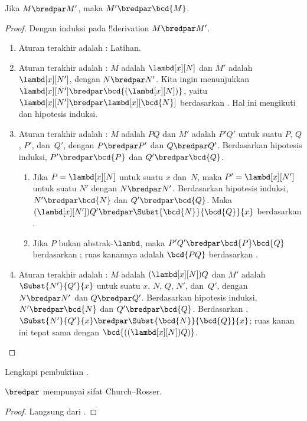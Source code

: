 \documentclass[../../../include/open-logic-section]{subfiles}
\begin{document}
\begin{lem}
  Jika $M \bredpar M'$, maka $M' \bredpar \bcd{M}$.
\end{lem}
\begin{proof}
  Dengan induksi pada !!{derivation} $M \bredpar M'$.
  \begin{enumerate}
    \item Aturan terakhir adalah : Latihan.
    \item Aturan terakhir adalah : $M$ adalah
      $\lambd[x][N]$ dan $M'$ adalah $\lambd[x][N']$, dengan
      $N\bredpar N'$. Kita ingin menunjukkan
      $\lambd[x][N']\bredpar\bcd{(\lambd[x][N])}$, yaitu
      $\lambd[x][N']\bredpar\lambd[x][\bcd{N}]$ berdasarkan
      . Hal ini mengikuti  dan
      hipotesis induksi.
    \item Aturan terakhir adalah : $M$ adalah $PQ$ dan
      $M'$ adalah $P'Q'$ untuk suatu $P$, $Q$, $P'$, dan~$Q'$, dengan
      $P\bredpar P'$ dan $Q\bredpar Q'$. Berdasarkan hipotesis induksi,
      $P'\bredpar\bcd{P}$ dan $Q'\bredpar\bcd{Q}$.
      \begin{enumerate}
        \item Jika $P=\lambd[x][N]$ untuk suatu $x$ dan~$N$, maka
          $P'=\lambd[x][N']$ untuk suatu $N'$ dengan $N\bredpar N'$.
          Berdasarkan hipotesis induksi, $N'\bredpar\bcd{N}$ dan
          $Q'\bredpar\bcd{Q}$. Maka
          $(\lambd[x][N'])Q'\bredpar\Subst{\bcd{N}}{\bcd{Q}}{x}$ berdasarkan
          .
        \item Jika $P$ bukan abstrak-$\lambd$, maka
          $P'Q'\bredpar\bcd{P}\bcd{Q}$ berdasarkan
          ; ruas kanannya adalah $\bcd{PQ}$ berdasarkan
          .
      \end{enumerate}
    \item Aturan terakhir adalah : $M$ adalah
      $(\lambd[x][N])Q$ dan $M'$ adalah $\Subst{N'}{Q'}{x}$ untuk suatu
      $x$, $N$, $Q$, $N'$, dan~$Q'$, dengan $N\bredpar N'$ dan
      $Q\bredpar Q'$. Berdasarkan hipotesis induksi,
      $N'\bredpar\bcd{N}$ dan $Q'\bredpar\bcd{Q}$. Berdasarkan
      ,
      $\Subst{N'}{Q'}{x}\bredpar\Subst{\bcd{N}}{\bcd{Q}}{x}$; ruas kanan
      ini tepat sama dengan $\bcd{((\lambd[x][N])Q)}$.
  \end{enumerate}
\end{proof}

\begin{prob}
  Lengkapi pembuktian .
\end{prob}

\begin{thm}
  $\bredpar$ mempunyai sifat Church--Rosser.
\end{thm}

\begin{proof}
  Langsung dari .
\end{proof}
\end{document}
